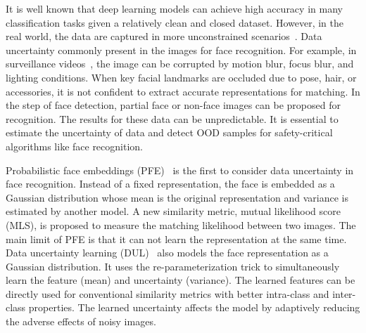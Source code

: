 \documentclass[letterpaper]{article} %
\begin{document}
It is well known that deep learning models can achieve high accuracy in many classification tasks given a relatively clean and closed dataset.
%
However, in the real world, the data are captured in more unconstrained scenarios~\cite{shi2016deep,wang2020suppressing}. Data uncertainty commonly present in the images for face recognition. For example, in surveillance videos~\cite{kalka2018ijb,maze2018iarpa,klare2015pushing}, the image can be corrupted by motion blur, focus blur, and lighting conditions. When key facial landmarks are occluded due to pose, hair, or accessories, it is not confident to extract accurate representations for matching. In the step of face detection, partial face or non-face images can be proposed for recognition. The results for these data can be unpredictable.
%
It is essential to estimate the uncertainty of data and detect OOD samples for safety-critical algorithms like face recognition.

Probabilistic face embeddings (PFE)~\cite{shi2019probabilistic} is the first to consider data uncertainty in face recognition. Instead of a fixed representation, the face is embedded as a Gaussian distribution whose mean is the original representation and variance is estimated by another model. A new similarity metric, mutual likelihood score (MLS), is proposed to measure the matching likelihood between two images.
%
The main limit of PFE is that it can not learn the representation at the same time.
%
Data uncertainty learning (DUL)~\cite{chang2020data} also models the face representation as a Gaussian distribution. It uses the re-parameterization trick to simultaneously learn the feature (mean) and uncertainty (variance). The learned features can be directly used for conventional similarity metrics with better intra-class and inter-class properties. The learned uncertainty affects the model by adaptively reducing the adverse effects of noisy images.
\end{document}
